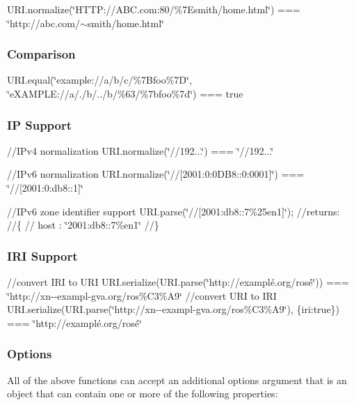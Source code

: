 U\+R\+I.\+normalize(\char`\"{}\+H\+T\+T\+P\+://\+A\+B\+C.\+com\+:80/\%7\+Esmith/home.\+html\char`\"{}) === \char`\"{}http\+://abc.\+com/$\sim$smith/home.\+html\char`\"{}

\subsubsection*{Comparison}

U\+R\+I.\+equal(\char`\"{}example\+://a/b/c/\%7\+Bfoo\%7\+D\char`\"{}, \char`\"{}e\+X\+A\+M\+P\+L\+E\+://a/./b/../b/\%63/\%7bfoo\%7d\char`\"{}) === true

\subsubsection*{IP Support}

//\+I\+Pv4 normalization U\+R\+I.\+normalize(\char`\"{}//192...\char`\"{}) === \char`\"{}//192...\char`\"{}

//\+I\+Pv6 normalization U\+R\+I.\+normalize(\char`\"{}//\mbox{[}2001\+:0\+:0\+D\+B8\+::0\+:0001\mbox{]}\char`\"{}) === \char`\"{}//\mbox{[}2001\+:0\+:db8\+::1\mbox{]}\char`\"{}

//\+I\+Pv6 zone identifier support U\+R\+I.\+parse(\char`\"{}//\mbox{[}2001\+:db8\+::7\%25en1\mbox{]}\char`\"{}); //returns\+: //\{ // host \+: \char`\"{}2001\+:db8\+::7\%en1\char`\"{} //\}

\subsubsection*{I\+RI Support}

//convert I\+RI to U\+RI U\+R\+I.\+serialize(U\+R\+I.\+parse(\char`\"{}http\+://examplé.\+org/rosé\char`\"{})) === \char`\"{}http\+://xn-\/-\/exampl-\/gva.\+org/ros\%\+C3\%\+A9\char`\"{} //convert U\+RI to I\+RI U\+R\+I.\+serialize(U\+R\+I.\+parse(\char`\"{}http\+://xn-\/-\/exampl-\/gva.\+org/ros\%\+C3\%\+A9\char`\"{}), \{iri\+:true\}) === \char`\"{}http\+://examplé.\+org/rosé\char`\"{}

\subsubsection*{Options}

All of the above functions can accept an additional options argument that is an object that can contain one or more of the following properties\+:


